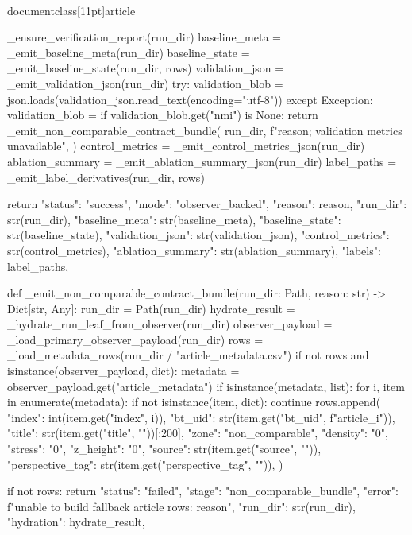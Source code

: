 \\documentclass[11pt]{article}
\begin{document}
\begin{CodeBlock}
    _ensure_verification_report(run_dir)
    baseline_meta = _emit_baseline_meta(run_dir)
    baseline_state = _emit_baseline_state(run_dir, rows)
    validation_json = _emit_validation_json(run_dir)
    try:
        validation_blob = json.loads(validation_json.read_text(encoding="utf-8"))
    except Exception:
        validation_blob = {}
    if validation_blob.get("nmi") is None:
        return _emit_non_comparable_contract_bundle(
            run_dir,
            f"{reason}; validation metrics unavailable",
        )
    control_metrics = _emit_control_metrics_json(run_dir)
    ablation_summary = _emit_ablation_summary_json(run_dir)
    label_paths = _emit_label_derivatives(run_dir, rows)

    return {
        "status": "success",
        "mode": "observer_backed",
        "reason": reason,
        "run_dir": str(run_dir),
        "baseline_meta": str(baseline_meta),
        "baseline_state": str(baseline_state),
        "validation_json": str(validation_json),
        "control_metrics": str(control_metrics),
        "ablation_summary": str(ablation_summary),
        "labels": label_paths,
    }


def _emit_non_comparable_contract_bundle(run_dir: Path, reason: str) -> Dict[str, Any]:
    run_dir = Path(run_dir)
    hydrate_result = _hydrate_run_leaf_from_observer(run_dir)
    observer_payload = _load_primary_observer_payload(run_dir)
    rows = _load_metadata_rows(run_dir / "article_metadata.csv")
    if not rows and isinstance(observer_payload, dict):
        metadata = observer_payload.get("article_metadata")
        if isinstance(metadata, list):
            for i, item in enumerate(metadata):
                if not isinstance(item, dict):
                    continue
                rows.append(
                    {
                        "index": int(item.get("index", i)),
                        "bt_uid": str(item.get("bt_uid", f"article_{i}")),
                        "title": str(item.get("title", ""))[:200],
                        "zone": "non_comparable",
                        "density": "0",
                        "stress": "0",
                        "z_height": "0",
                        "source": str(item.get("source", "")),
                        "perspective_tag": str(item.get("perspective_tag", "")),
                    }
                )

    if not rows:
        return {
            "status": "failed",
            "stage": "non_comparable_bundle",
            "error": f"unable to build fallback article rows: {reason}",
            "run_dir": str(run_dir),
            "hydration": hydrate_result,
        }


\end{CodeBlock}
\end{document}
